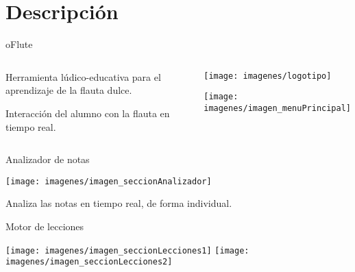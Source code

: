 \documentclass[11pt,xcolor=svgnames]{beamer}
\begin{document}
\section{Descripción}
{

\begin{frame}{oFlute}
  \begin{columns}

    \begin{block}{}
      \begin{center}
        \Large
        Herramienta lúdico-educativa para el aprendizaje de la flauta dulce.

        \medskip
        \medskip

        Interacción del alumno con la flauta en tiempo real.
      \end{center}
    \end{block}

    \begin{block}{}
      \begin{center}
        \vspace{-1.5cm}
        \texttt{[image: imagenes/logotipo]}

        \bigskip
        \bigskip

        \texttt{[image: imagenes/imagen\_menuPrincipal]}
      \end{center}
    \end{block}   
  \end{columns}
\end{frame}


\begin{frame}{Analizador de notas}
  \begin{center}
    \texttt{[image: imagenes/imagen\_seccionAnalizador]}

  Analiza las notas en tiempo real, de forma individual.
  \end{center}
\end{frame}

\begin{frame}{Motor de lecciones}

  \begin{center}
    \texttt{[image: imagenes/imagen\_seccionLecciones1]}\hspace{0.1cm}
    \texttt{[image: imagenes/imagen\_seccionLecciones2]}


\end{center}
\end{frame}}
\end{document}
